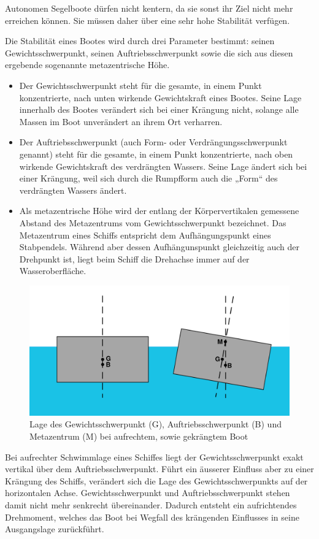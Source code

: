Autonomen Segelboote dürfen nicht kentern, da sie sonst ihr Ziel nicht mehr erreichen können. Sie müssen daher über eine sehr hohe Stabilität verfügen.

Die Stabilität eines Bootes wird durch drei Parameter bestimmt: seinen Gewichtsschwerpunkt, seinen Auftriebsschwerpunkt sowie die sich aus diesen ergebende sogenannte metazentrische Höhe.\cite{noauthor_stabilitat_2023-1}  
\begin{itemize}
    \item Der Gewichtsschwerpunkt steht für die gesamte, in einem Punkt konzentrierte, nach unten wirkende Gewichtskraft eines Bootes. Seine Lage innerhalb des Bootes verändert sich bei einer Krängung nicht, solange alle Massen im Boot unverändert an ihrem Ort verharren.
    \item Der Auftriebsschwerpunkt (auch Form- oder Verdrängungsschwerpunkt genannt) steht für die gesamte, in einem Punkt konzentrierte, nach oben wirkende Gewichtskraft des verdrängten Wassers. Seine Lage ändert sich bei einer Krängung, weil sich durch die Rumpfform auch die „Form“ des verdrängten Wassers ändert.
    \item Als metazentrische Höhe wird der entlang der Körpervertikalen gemessene Abstand des Metazentrums vom Gewichtsschwerpunkt bezeichnet. Das Metazentrum eines Schiffs entspricht dem Aufhängungspunkt eines Stabpendels. Während aber dessen  Aufhängunspunkt gleichzeitig auch der Drehpunkt ist, liegt beim Schiff die Drehachse immer auf der Wasseroberfläche.\cite{noauthor_metazentrische_nodate}
\end{itemize}
\begin{figure}[H]
    \centering
    \includegraphics[width=0.75\linewidth]{Metacentriskhojd-svg.svg.png}
    \caption{Lage des Gewichtsschwerpunkt (G), Auftriebsschwerpunkt (B) und Metazentrum (M) bei aufrechtem, sowie gekrängtem Boot }
    \label{fig:enter-label}
\end{figure}
Bei aufrechter Schwimmlage eines Schiffes liegt der Gewichtsschwerpunkt exakt vertikal über dem Auftriebsschwerpunkt. Führt ein äusserer Einfluss aber zu einer Krängung des Schiffs, verändert sich die Lage des Gewichtsschwerpunkts auf der horizontalen Achse. Gewichtsschwerpunkt und Auftriebsschwerpunkt stehen damit nicht mehr senkrecht übereinander. Dadurch entsteht ein aufrichtendes Drehmoment, welches das Boot bei Wegfall des krängenden Einflusses in seine Ausgangslage zurückführt.

